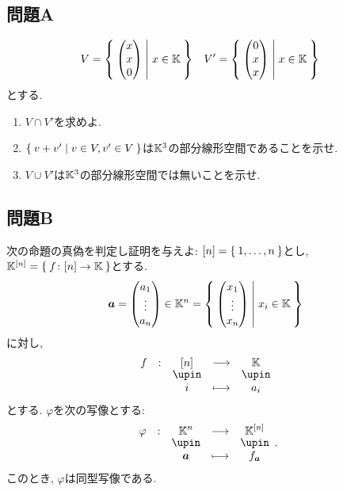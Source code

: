 \subsection{問題A}
\begin{quiz}
  \begin{align*}
    V&=\Set{\begin{pmatrix}x\\x\\0\end{pmatrix}|x\in \mathbb{K}}&
    V'&=\Set{\begin{pmatrix}0\\x\\x\end{pmatrix}|x\in \mathbb{K}}
  \end{align*}
  とする.
  \begin{enumerate}
    \item $V\cap V'$を求めよ.
    \item $\Set{v+v'|v\in V,v'\in V}$は$\mathbb{K}^3$の部分線形空間であることを示せ.
    \item $V\cup V'$は$\mathbb{K}^3$の部分線形空間では無いことを示せ.
  \end{enumerate}
\end{quiz}



\subsection{問題B}

\begin{quiz}
  次の命題の真偽を判定し証明を与えよ:
  $[n]=\Set{1,\ldots,n}$とし,
  $\mathbb{K}^{[n]}=\Set{f\colon [n]\to \mathbb{K}}$とする.
  \begin{align*}
    \boldsymbol{a}=\begin{pmatrix}a_1\\\vdots\\a_n\end{pmatrix}\in
    \mathbb{K}^{n}=\Set{\begin{pmatrix}x_1\\\vdots\\x_n\end{pmatrix}|x_i\in\mathbb{K}}
  \end{align*}
  に対し,
  \begin{align*}
    \shazo{f}{[n]}{\KK}{i}{a_i}
  \end{align*}
  とする.  
  $\varphi$を次の写像とする:
  \begin{align*}
    \shazo{\varphi}{\KK^{n}}{\KK^{[n]}}{\aaa}{f_{\aaa}}.
  \end{align*}
  このとき, $\varphi$は同型写像である.
\end{quiz}

